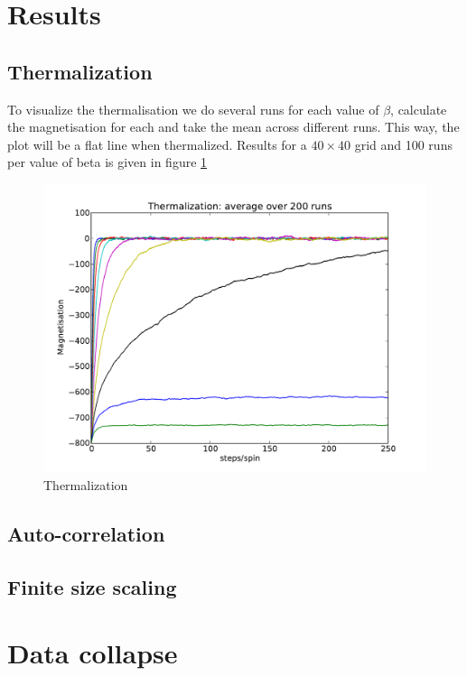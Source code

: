 \documentclass[11pt,twocolumn]{article}
\begin{document}
\section{Results}
\subsection{Thermalization}
To visualize the thermalisation we do several runs for each value of $\beta$, calculate the magnetisation for each and take the mean across different runs. This way, the plot will be a flat line when thermalized. Results for a $40\times40$ grid and 100 runs per value of beta is given in figure \ref{therm}
\begin{figure}[!ht]
\centering \includegraphics[width=\columnwidth]{figs/therm.pdf}
\caption{Thermalization}
\label{therm}
\end{figure}
\subsection{Auto-correlation}
\subsection{Finite size scaling}
\section{Data collapse}
{}

\end{document}
